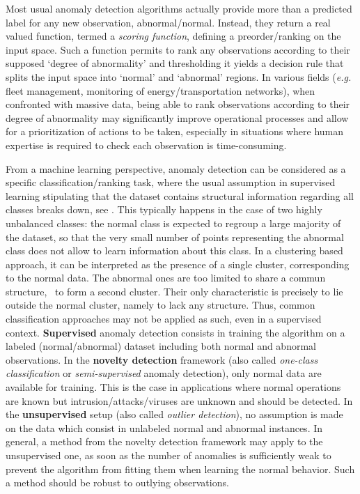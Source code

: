  Most usual anomaly detection algorithms actually
provide more than a predicted label for any new observation, abnormal/normal. Instead,
they return a real valued function,  termed a \textit{scoring function}, defining a preorder/ranking on the input space. Such a function permits to rank any observations according to their supposed `degree of abnormality' and thresholding it yields a decision rule that splits the input space into `normal' and `abnormal' regions.
In various fields (\textit{e.g.} fleet management, monitoring of energy/transportation networks), when confronted with massive data, being able to rank observations according to their degree of abnormality may significantly improve operational processes and allow for a prioritization of actions to be taken, especially in situations where human expertise is required to check each observation is time-consuming.


From a machine learning perspective, anomaly detection can be considered as a specific classification/ranking task, where the usual assumption in supervised learning stipulating that the dataset contains structural information regarding all classes breaks down, see \cite{Roberts99}. This typically happens in the case of two highly unbalanced classes: the normal class is expected to regroup a large majority of the dataset, so that the very small number of points representing the abnormal class does not allow to learn information about this class.
In a clustering based approach, it can be
interpreted as the presence of a single cluster, corresponding to the
normal data. The abnormal ones are too limited to share a commun
structure, \ie~to form a second cluster. Their only characteristic is
precisely to lie outside the normal cluster, namely to lack any
structure.  Thus, common classification approaches may not be applied
as such, even in a supervised
context. %
\textbf{Supervised} anomaly detection consists in training the algorithm on a labeled (normal/abnormal) dataset including both normal and abnormal observations. In the \textbf{novelty detection} framework (also called \emph{one-class classification} or \emph{semi-supervised} anomaly detection), only normal data are available for training. This is the case in applications where normal operations are known but intrusion/attacks/viruses are unknown and should be detected. In the \textbf{unsupervised} setup (also called \emph{outlier detection}), no assumption is made on the data which consist in unlabeled normal and abnormal instances. In general, a method from the novelty detection framework may apply to the unsupervised one, as soon as the number of anomalies is sufficiently weak to prevent the algorithm from fitting them when learning the normal behavior. Such a method should be robust to outlying observations.

